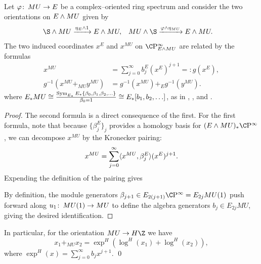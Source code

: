 \begin{lemma}\label{OrientationsOnEAndMU}
Let \(\varphi\colon\thinspace MU \to E\) be a complex--oriented ring spectrum and consider the two orientations on \(E \wedge MU\) given by
\begin{align*}
\S \sm MU & \xrightarrow{\eta_E \sm 1} E \sm MU, &
MU \sm \S & \xrightarrow{\phi \sm \eta_{MU}} E \sm MU.
\end{align*}
The two induced coordinates \(x^E\) and \(x^{MU}\) on \(\CP^\infty_{E \sm MU}\) are related by the formulas
\begin{align*}
x^{MU} & = \sum_{j=0}^\infty b_j^E (x^E)^{j+1} =: g(x^E), \\
g^{-1}(x^{MU} +_{MU} y^{MU}) & = g^{-1}(x^{MU}) +_E g^{-1}(y^{MU}).
\end{align*}
where \(E_* MU \cong \frac{\operatorname{Sym}_{E_*} E_*\{\beta_0, \beta_1, \beta_2, \ldots\}}{\beta_0 = 1} \cong E_*[b_1, b_2, \ldots]\), as in , , and .
\end{lemma}
\begin{proof}
The second formula is a direct consequence of the first.  For the first formula, note that because \(\{\beta_j^E\}_j\) provides a homology basis for \((E \sm MU)_* \CP^\infty\), we can decompose \(x^{MU}\) by the Kronecker pairing: \[x^{MU} = \sum_{j=0}^\infty \langle x^{MU}, \beta_j^E\rangle (x^E)^{j+1}.\]  Expending the definition of the pairing gives
\begin{center}
\end{center}
By definition, the module generators \(\beta_{j+1} \in E_{2(j+1)} \CP^\infty = E_{2j} MU(1)\) push forward along \(u_1\colon\thinspace MU(1) \to MU\) to define the algebra generators \(b_j \in E_{2j} MU\), giving the desired identification.
\end{proof}

\begin{corollary}\label{HZMUCarriesALog}
In particular, for the orientation \(MU \to H\Z\) we have \[x_1 +_{MU} x_2 = \exp^H(\log^H(x_1) + \log^H(x_2)),\] where \(\exp^H(x) = \sum_{j=0}^\infty b_j x^{j+1}\). \qed
\end{corollary}

